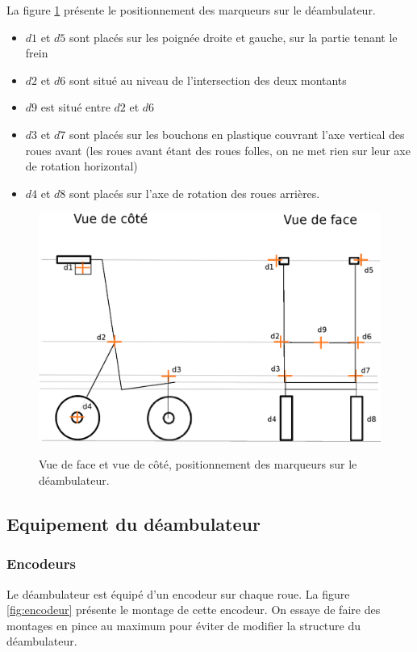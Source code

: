 \documentclass[a4paper, 10pt ]{article}
\begin{document}
La figure \ref{fig:deambulateur} présente le positionnement des marqueurs sur le déambulateur. 

\begin{itemize}
\item $d1$ et $d5$ sont placés sur les poignée droite et gauche, sur la partie tenant le frein
\item $d2$ et $d6$ sont situé au niveau de l'intersection des deux montants
\item $d9$ est situé entre $d2$ et $d6$ 
\item $d3$ et $d7$ sont placés sur les bouchons en plastique couvrant l'axe vertical des roues avant (les roues avant étant des roues folles, on ne met rien sur leur axe de rotation horizontal)
\item $d4$ et $d8$ sont placés sur l'axe de rotation des roues arrières.

\end{itemize}

\begin{figure}
\includegraphics[width=0.7\columnwidth]{images/deambulateur.eps}
\label{fig:deambulateur}
\caption{Vue de face et vue de côté, positionnement des marqueurs sur le déambulateur.}
\end{figure}


\subsection{Equipement du déambulateur}

\subsubsection{Encodeurs}

Le déambulateur est équipé d'un encodeur sur chaque roue.
La figure \ref{fig:encodeur} présente le montage de cette encodeur. On essaye de faire des montages en pince au maximum pour éviter de modifier la structure du déambulateur.
\end{document}
